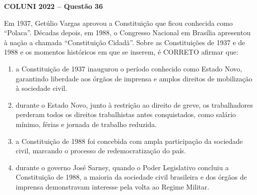 \textbf{COLUNI 2022 -- Questão 36}\par\medskip Em 1937, Getúlio Vargas aprovou a Constituição que ficou conhecida como “Polaca”. Décadas depois, em 1988, o Congresso Nacional em Brasília apresentou à nação a chamada “Constituição Cidadã”. Sobre as Constituições de 1937 e de 1988 e os momentos históricos em que se inserem, é CORRETO afirmar que:\begin{enumerate}
\item a Constituição de 1937 inaugurou o período conhecido como Estado Novo, garantindo liberdade aos
      órgãos de imprensa e amplos direitos de mobilização à sociedade civil.
\item durante o Estado Novo, junto à restrição ao direito de greve, os trabalhadores perderam todos os
      direitos trabalhistas antes conquistados, como salário mínimo, férias e jornada de trabalho reduzida.
\item a Constituição de 1988 foi concebida com ampla participação da sociedade civil, marcando o
      processo de redemocratização do país.
\item durante o governo José Sarney, quando o Poder Legislativo concluiu a Constituição de 1988, a maioria da
      sociedade civil brasileira e dos órgãos de imprensa demonstravam interesse pela volta ao Regime Militar.\end{enumerate}
